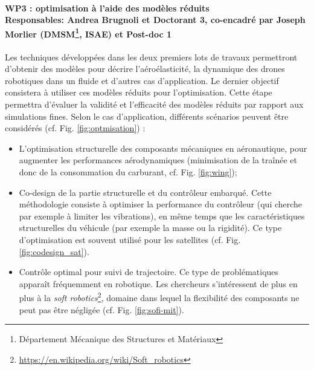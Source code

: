 \documentclass[12pt, french]{article}
\begin{document}
	
	\paragraph[\large WP3 : optimisation à l'aide des modèles réduits\\
	Responsables: Andrea Brugnoli et Doctorant 3, co-encadré par Joseph Morlier (DMSM, ISAE) et Post-doc 1\\]{\large WP3 : optimisation à l'aide des modèles réduits\\
		Responsables: Andrea Brugnoli et Doctorant 3, co-encadré par Joseph Morlier (DMSM\footnote{Département Mécanique des Structures et Matériaux}, ISAE) et Post-doc 1\\}
	
	Les techniques développées dans les deux premiers lots de travaux permettront d'obtenir des modèles pour décrire l'aéroélasticité, la dynamique des drones robotiques dans un fluide et d'autres cas d'application.
	Le dernier objectif consistera à utiliser ces modèles réduits pour l'optimisation. Cette étape permettra d'évaluer la validité et l'efficacité des modèles réduits par rapport aux simulations fines. Selon le cas d'application, différents scénarios peuvent être considérés (cf. Fig. \ref{fig:optmisation}) : 
	\begin{itemize}
		\item L'optimisation structurelle des composants mécaniques en aéronautique, pour augmenter les performances aérodynamiques (minimisation de la traînée et donc de la consommation du carburant, cf. Fig. \ref{fig:wing}); 
		\item Co-design de la partie structurelle et du contrôleur embarqué. Cette méthodologie consiste à optimiser la performance du contrôleur (qui cherche par exemple à limiter les vibrations), en même temps que les caractéristiques structurelles du véhicule (par exemple la masse ou la rigidité). Ce type d'optimisation est souvent utilisé pour les satellites (cf. Fig. \ref{fig:codesign_sat}).
		\item Contrôle optimal pour suivi de trajectoire. Ce type de problématiques apparaît fréquemment en robotique. Les chercheurs s'intéressent de plus en plus à la \textit{soft robotics}\footnote{\url{https://en.wikipedia.org/wiki/Soft_robotics}}, domaine dans lequel la flexibilité des composants ne peut pas être négligée (cf. Fig. \ref{fig:sofi-mit}).
	\end{itemize}
	
\end{document}
